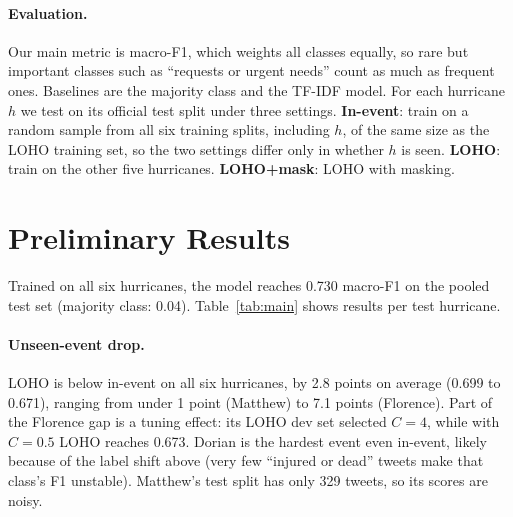 \documentclass[11pt,a4paper]{article}
\begin{document}
\paragraph{Evaluation.} Our main metric is macro-F1, which weights all classes equally, so rare but important classes such as ``requests or urgent needs'' count as much as frequent ones. Baselines are the majority class and the TF-IDF model. For each hurricane $h$ we test on its official test split under three settings. \textbf{In-event}: train on a random sample from all six training splits, including $h$, of the same size as the LOHO training set, so the two settings differ only in whether $h$ is seen. \textbf{LOHO}: train on the other five hurricanes. \textbf{LOHO+mask}: LOHO with masking.

\section{Preliminary Results}

Trained on all six hurricanes, the model reaches 0.730 macro-F1 on the pooled test set (majority class: 0.04). Table~\ref{tab:main} shows results per test hurricane.

\begin{table}[t]
\centering
\small
\setlength{\tabcolsep}{4pt}

\caption{\label{tab:main} Macro-F1 on each hurricane's test split. In-event and LOHO train on the same number of tweets; only LOHO excludes the test hurricane.}
\end{table}

\begin{table}[t]
\centering
\small
\setlength{\tabcolsep}{4pt}

\caption{\label{tab:per_class} Per-class F1 of the paired in-event and LOHO models of Table~\ref{tab:main}, averaged over test hurricanes (skipping hurricanes whose test split lacks the class).}
\end{table}

\paragraph{Unseen-event drop.} LOHO is below in-event on all six hurricanes, by 2.8 points on average (0.699 to 0.671), ranging from under 1 point (Matthew) to 7.1 points (Florence). Part of the Florence gap is a tuning effect: its LOHO dev set selected $C=4$, while with $C=0.5$ LOHO reaches 0.673. Dorian is the hardest event even in-event, likely because of the label shift above (very few ``injured or dead'' tweets make that class's F1 unstable). Matthew's test split has only 329 tweets, so its scores are noisy.
\end{document}
